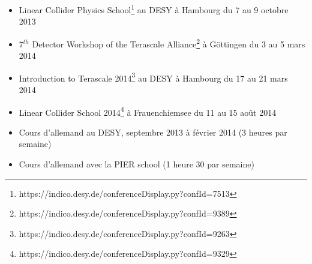 \documentclass[a4papper, 10pt]{article}
\begin{document}
  \begin{itemize}
    \item  Linear Collider Physics School\footnote{https://indico.desy.de/conferenceDisplay.py?confId=7513} au DESY à Hambourg du 7 au 9 octobre 2013
    \item  7$^{th}$ Detector Workshop of the Terascale Alliance\footnote{https://indico.desy.de/conferenceDisplay.py?confId=9389} à Göttingen du 3 au 5 mars 2014
    \item  Introduction to Terascale 2014\footnote{https://indico.desy.de/conferenceDisplay.py?confId=9263} au DESY à Hambourg du 17 au 21 mars 2014
    \item  Linear Collider School 2014\footnote{https://indico.desy.de/conferenceDisplay.py?confId=9329} à Frauenchiemsee du 11 au 15 août 2014
    \item Cours d'allemand au DESY, septembre 2013 à février 2014 (3 heures par semaine)
    \item Cours d'allemand avec la PIER school (1 heure 30 par semaine)
  \end{itemize}
\end{document}
